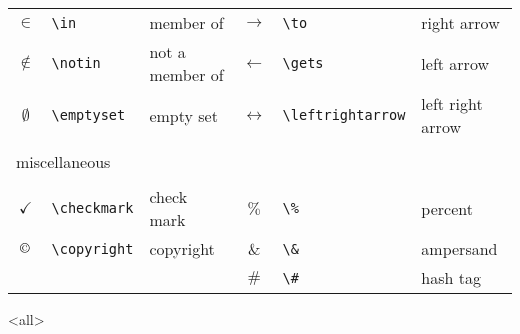 \begin{table}[ht!]
\begin{tabular}{cll|cll}
        $\in$	        &	\verb|\in|	        &	member of	        &	$\to$	            &	\verb|\to|	            &	right arrow	        \\
        $\notin$	    &	\verb|\notin|	    &	not a member of	    &	$\gets$	            &	\verb|\gets|	        &	left arrow	        \\
        $\emptyset$	&	\verb|\emptyset|	    &	empty set	        &	$\leftrightarrow$	&	\verb|\leftrightarrow|	&	left right arrow	\\
        \\\multicolumn{2}{l}{miscellaneous}		&		                &		                &		                    &		                \\\\
        $\checkmark$	&	\verb|\checkmark|	&	check mark	        &	$\%$	            &	\verb|\%|	            &	percent	            \\
        $\copyright$	&	\verb|\copyright|	&	copyright	        &	$\&$	            &	\verb|\&|	            &	ampersand	        \\
        	            &		                &		                &	$\#$	            &	\verb|\#|	            &	hash tag            \\
        \bottomrule
    \end{tabular}
\end{table}

\mode<all>
